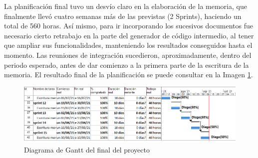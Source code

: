 La planificación final tuvo un desvío claro en la elaboración de la memoria, que finalmente llevó cuatro semanas más de las previstas (2 Sprints), haciendo un total de 560 horas. Así mismo, para ir incorporando los sucesivos documentos fue necesario cierto retrabajo en la parte del generador de código intermedio, al tener que ampliar sus funcionalidades, manteniendo los resultados conseguidos hasta el momento. Las reuniones de integración sucedieron, aproximadamente, dentro del periodo esperado, antes de dar comienzo a la primera parte de la escritura de la memoria. El resultado final de la planificación se puede consultar en la Imagen \ref{fig:gantt-final}.

\begin{figure}[hp!]
	\centering
	\includegraphics[angle=0,width=1.0\textwidth]{imaxes/f-planificacion/gantt-final}
	\caption{Diagrama de Gantt del final del proyecto}
	\label{fig:gantt-final}
\end{figure}
